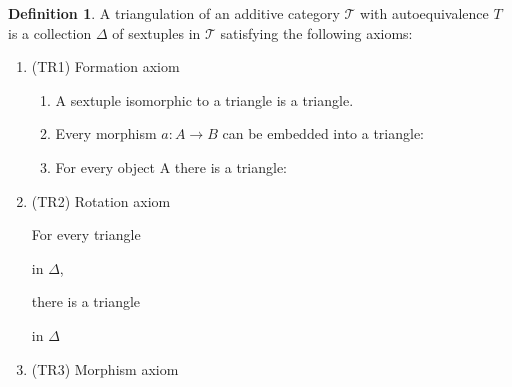 \documentclass[12pt]{article}
\theoremstyle{definition}
\newtheorem{definition}{Definition}[section]
\theoremstyle{remark}
\begin{document}
        \begin{definition}
            A triangulation of an additive category $\mathcal{T}$ with autoequivalence $T$ is a collection $\Delta$ of sextuples in $\mathcal{T}$ satisfying the following axioms: 

            \begin{enumerate}
                \item (TR1) Formation axiom

                    \begin{enumerate}
                        \item A sextuple isomorphic to a triangle is a triangle.
                        \item Every morphism $a : A \rightarrow B$ can be embedded into a triangle:
                        \begin{center}
                        \end{center}
                        \item For every object A there is a triangle:
                        \begin{center}
                        \end{center}
                    \end{enumerate}
                \item (TR2) Rotation axiom

                    For every triangle
                    in $\Delta$,

                    there is a triangle
                    in $\Delta$
                \item (TR3) Morphism axiom
                

\end{enumerate}
\end{definition}
\end{document}
